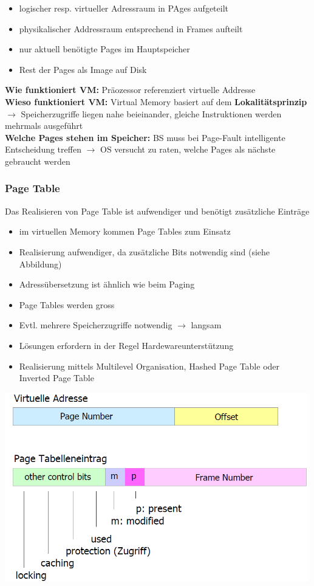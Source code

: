 \documentclass{report}
\newenvironment{Figure}
	{\par\medskip\noindent\minipage{\linewidth}}
	{\endminipage\par\medskip}
\theoremstyle{definition}
\theoremstyle{example}
\begin{document}
\begin{itemize}
	\item logischer resp. virtueller Adressraum in PAges aufgeteilt
	\item physikalischer Addressraum entsprechend in Frames aufteilt
	\item nur aktuell benötigte Pages im Hauptspeicher
	\item Rest der Pages als Image auf Disk
\end{itemize}

\textbf{Wie funktioniert VM:} Präozessor referenziert virtuelle Addresse\\
\textbf{Wieso funktioniert VM:} Virtual Memory basiert auf dem \textbf{Lokalitätsprinzip} $\rightarrow$ Speicherzugriffe liegen nahe beieinander, gleiche Instruktionen werden mehrmals ausgeführt\\
\textbf{Welche Pages stehen im Speicher:} BS muss bei Page-Fault intelligente Entscheidung treffen $\rightarrow$ OS versucht zu raten, welche Pages als nächste gebraucht werden

		\subsubsection{Page Table}
Das Realisieren von Page Table ist aufwendiger und benötigt zusätzliche Einträge

\begin{itemize}
	\item im virtuellen Memory kommen Page Tables zum Einsatz
	\item Realisierung aufwendiger, da zusätzliche Bits notwendig sind (siehe Abbildung)
	\item Adressübersetzung ist ähnlich wie beim Paging
	\item Page Tables werden gross
	\item Evtl. mehrere Speicherzugriffe notwendig $\rightarrow$ langsam
	\item Lösungen erfordern in der Regel Hardewareunterstützung
	\item Realisierung mittels Multilevel Organisation, Hashed Page Table oder Inverted Page Table
\end{itemize}

\begin{Figure}
\centering
\includegraphics[width=500px]{img/PageTable.png}
	\label{fig:Abbildung einer Page Table}
\end{Figure}
\end{document}
